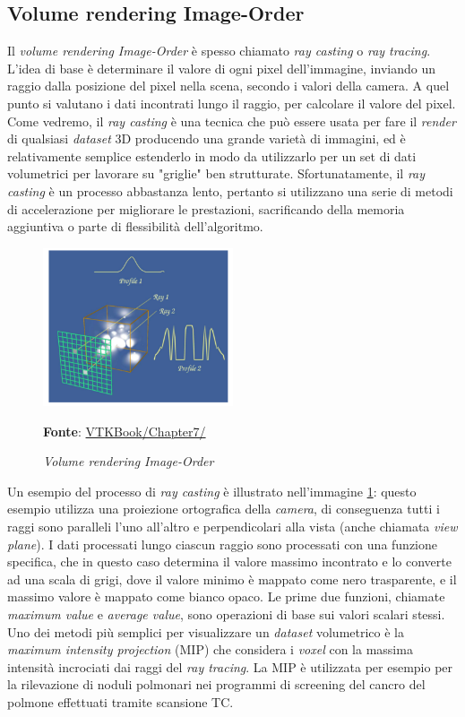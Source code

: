 \subsection{Volume rendering Image-Order}\label{sec:volume-image-order}
Il \emph{volume rendering Image-Order} è spesso chiamato \emph{ray casting} o \emph{ray tracing}. L'idea di base è determinare il valore di ogni pixel dell'immagine, inviando un raggio dalla posizione del pixel nella scena, secondo i valori della camera. A quel punto si  valutano i dati incontrati lungo il raggio, per calcolare il valore del pixel. Come vedremo, il \emph{ray casting} è una tecnica che può essere usata per fare il \emph{render} di qualsiasi \emph{dataset} 3D producendo una grande varietà di immagini, ed è relativamente semplice estenderlo in modo da utilizzarlo per un set di dati volumetrici per lavorare su "griglie" ben strutturate. Sfortunatamente, il \emph{ray casting} è un processo abbastanza lento, pertanto si utilizzano una serie di metodi di accelerazione per migliorare le prestazioni, sacrificando della memoria aggiuntiva o parte di flessibilità dell'algoritmo.

\begin{figure}[h]
    \centering
    \includegraphics[width=0.5\textwidth]{immagini/volumerendering/imageorder.png}
    \caption{\textit{Volume rendering Image-Order}}
    \textbf{Fonte}: \href{https://lorensen.github.io/VTKExamples/site/VTKBook/07Chapter7/}{VTKBook/Chapter7/}
    \label{fig: Volume Rendering Image-Order}
\end{figure}

Un esempio del processo di \emph{ray casting} è illustrato nell'immagine \ref{fig: Volume Rendering Image-Order}: questo esempio utilizza una proiezione ortografica della \emph{camera}, di conseguenza tutti i raggi sono paralleli l'uno all'altro e perpendicolari alla vista (anche chiamata \emph{view plane}).
I dati processati lungo ciascun raggio sono processati con una funzione specifica, che in questo caso determina il valore massimo incontrato e lo converte ad una scala di grigi, dove il valore minimo è mappato come nero trasparente, e il massimo valore è mappato come bianco opaco. Le prime due funzioni, chiamate \emph{maximum value} e \emph{average value}, sono operazioni di base sui valori scalari stessi. Uno dei metodi più semplici per visualizzare un \emph{dataset} volumetrico è la \emph{maximum intensity projection} (MIP) che considera i \emph{voxel} con la massima intensità incrociati dai raggi del \emph{ray tracing}. La MIP è utilizzata per esempio per la rilevazione di noduli polmonari nei programmi di screening del cancro del polmone effettuati tramite scansione TC.

